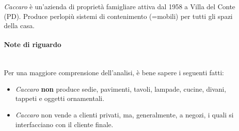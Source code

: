 \textit{Caccaro} è un'azienda di proprietà famigliare attiva dal 1958 a Villa del Conte (PD). Produce perlopiù sistemi di contenimento (=mobili) per tutti gli spazi della casa.

\paragraph*{Note di riguardo}\mbox{}\\
Per una maggiore comprensione dell'analisi, è bene sapere i seguenti fatti:
\begin{itemize}
	\item \textit{Caccaro} \textbf{non} produce sedie, pavimenti, tavoli, lampade, cucine, divani, tappeti e oggetti ornamentali.
	\item \textit{Caccaro} non vende a clienti privati, ma, generalmente, a negozi, i quali si interfacciano con il cliente finale.
\end{itemize}